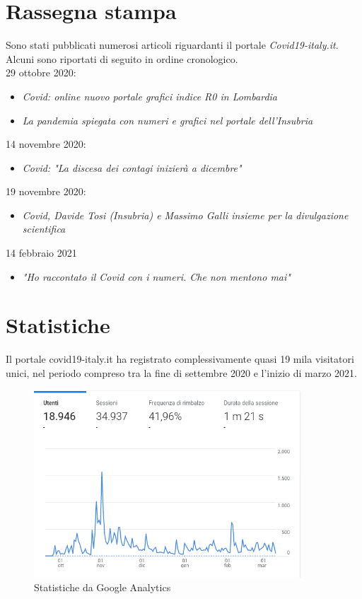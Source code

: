 \section{Rassegna stampa}
Sono stati pubblicati numerosi articoli riguardanti il portale \emph{Covid19-italy.it}.\\
Alcuni sono riportati di seguito in ordine cronologico.\\

29 ottobre 2020: 
\begin{itemize}
    \item \emph{Covid: online nuovo portale grafici indice R0 in Lombardia}\cite{covid19-italy_ansa}
    \item \emph{La pandemia spiegata con numeri e grafici nel portale dell’Insubria}\cite{covid19-italy_varesenews}
\end{itemize}
14 novembre 2020:
\begin{itemize}
    \item \emph{Covid: "La discesa dei contagi inizierà a dicembre"}\cite{discesa_contagi_giorno}
\end{itemize}
19 novembre 2020:
\begin{itemize}
    \item \emph{Covid, Davide Tosi (Insubria) e Massimo Galli insieme per la divulgazione scientifica}\cite{covid_corriere_como}
\end{itemize}
14 febbraio 2021
\begin{itemize}
    \item \emph{"Ho raccontato il Covid con i numeri. Che non mentono mai"}\cite{raccontato_covid_ilgiorno}
\end{itemize}
\newpage
\section{Statistiche}
Il portale covid19-italy.it ha registrato complessivamente quasi 19 mila visitatori unici, nel periodo compreso tra la fine di settembre 2020 e l'inizio di marzo 2021.
\begin{figure}[htp]
    \centering
    \includegraphics[width=10cm]{img/analytics.png}
    \caption{Statistiche da Google Analytics}
    \label{fig:statistics}
\end{figure}
